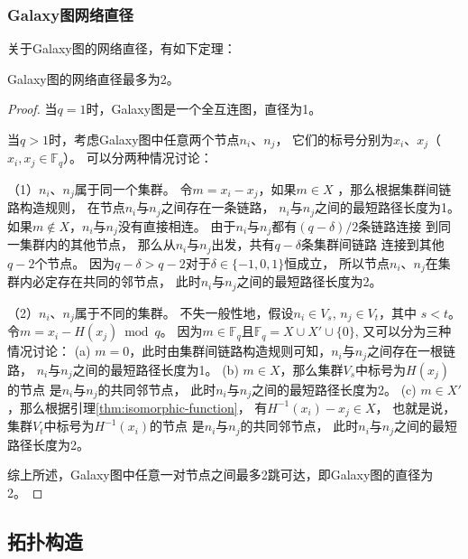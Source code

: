 \subsubsection{Galaxy图网络直径}

关于Galaxy图的网络直径，有如下定理：
\begin{theorem}
\label{proofgalaxygraph}
Galaxy图的网络直径最多为2。
\end{theorem}

\begin{proof}

当$q=1$时，Galaxy图是一个全互连图，直径为1。

当$q>1$时，考虑Galaxy图中任意两个节点$n_i$、$n_j$，
它们的标号分别为$x_i$、$x_j$（$x_i, x_j \in \mathds{F}_q$）。
可以分两种情况讨论：

（1）$n_i$、$n_j$属于同一个集群。
令$m = x_i - x_j$，如果$m \in X$ ，那么根据集群间链路构造规则，
在节点$n_i$与$n_j$之间存在一条链路，
$n_i$与$n_j$之间的最短路径长度为1。
如果$m \notin X$，$n_i$与$n_j$没有直接相连。
由于$n_i$与$n_j$都有$(q-\delta)/2$条链路连接
到同一集群内的其他节点，
那么从$n_i$与$n_j$出发，共有$q-\delta$条集群间链路
连接到其他$q-2$个节点。
因为$q-\delta > q-2$对于$\delta \in \{-1,0,1\}$恒成立，
所以节点$n_i$、$n_j$在集群内必定存在共同的邻节点，
此时$n_i$与$n_j$之间的最短路径长度为2。

（2）$n_i$、$n_j$属于不同的集群。
不失一般性地，假设$n_i \in V_s$,  $n_j \in V_t$，其中 $s < t$。
令$m = x_i - H(x_j) \bmod q$。
因为$m \in \mathds{F}_q$且$\mathds{F}_q = X \cup X' \cup \{0\}$,
又可以分为三种情况讨论：
(a) $m = 0$，此时由集群间链路构造规则可知，$n_i$与$n_j$之间存在一根链路，
$n_i$与$n_j$之间的最短路径长度为1。
(b) $m \in X$，那么集群$V_s$中标号为$H(x_j)$的节点
是$n_i$与$n_j$的共同邻节点，
此时$n_i$与$n_j$之间的最短路径长度为2。
(c) $m \in X'$，那么根据引理\ref{thm:isomorphic-function}，
有$H^{-1}(x_i) - x_j \in X$，
也就是说，集群$V_t$中标号为$H^{-1}(x_i)$的节点
是$n_i$与$n_j$的共同邻节点，
此时$n_i$与$n_j$之间的最短路径长度为2。

综上所述，Galaxy图中任意一对节点之间最多2跳可达，即Galaxy图的直径为2。

\end{proof}

\subsection{拓扑构造}


